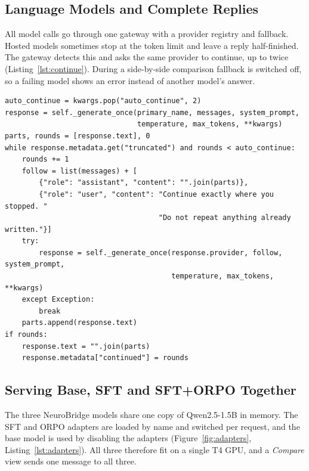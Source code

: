 \documentclass[11pt,a4paper]{article}
\newcommand{\code}[1]{\texttt{#1}}
\begin{document}
\subsection{Language Models and Complete Replies}
All model calls go through one gateway with a provider registry and fallback. Hosted models
sometimes stop at the token limit and leave a reply half-finished. The gateway detects this and asks the same
provider to continue, up to twice (Listing~\ref{lst:continue}). During a side-by-side comparison
fallback is switched off, so a failing model shows an error instead of another model's answer.

\par\noindent\begin{minipage}{\linewidth}\begin{lstlisting}[caption={Automatic continuation of replies cut off by the token limit (\code{agent/llm/gateway.py}).},label={lst:continue}]
auto_continue = kwargs.pop("auto_continue", 2)
response = self._generate_once(primary_name, messages, system_prompt,
                               temperature, max_tokens, **kwargs)
parts, rounds = [response.text], 0
while response.metadata.get("truncated") and rounds < auto_continue:
    rounds += 1
    follow = list(messages) + [
        {"role": "assistant", "content": "".join(parts)},
        {"role": "user", "content": "Continue exactly where you stopped. "
                                    "Do not repeat anything already written."}]
    try:
        response = self._generate_once(response.provider, follow, system_prompt,
                                       temperature, max_tokens, **kwargs)
    except Exception:
        break
    parts.append(response.text)
if rounds:
    response.text = "".join(parts)
    response.metadata["continued"] = rounds
\end{lstlisting}\end{minipage}\par

\subsection{Serving Base, SFT and SFT+ORPO Together}
The three NeuroBridge models share one copy of Qwen2.5-1.5B in memory. The SFT and ORPO
adapters are loaded by name and switched per request, and the base model is used by disabling the
adapters (Figure~\ref{fig:adapters}, Listing~\ref{lst:adapters}). All three therefore fit on a single T4
GPU, and a \emph{Compare} view sends one message to all three.
\end{document}
